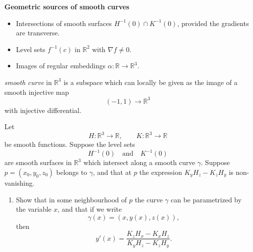 \begin{problem}
	\par\medskip\noindent\textbf{Geometric sources of smooth curves}\par\smallskip

	\begin{itemize}
		\item Intersections of smooth surfaces $H^{-1}(0)\cap K^{-1}(0)$,
		provided the gradients are transverse.
		\item Level sets $f^{-1}(c)$ in $\mathbb{R}^2$ with $\nabla f \neq 0$.
		\item Images of regular embeddings $\alpha : \mathbb{R}\to\mathbb{R}^3$.
	\end{itemize}
	
	 \emph{smooth curve} in $\mathbb{R}^3$ is a subspace which can locally be
	given as the image of a smooth injective map
	\[
	(-1,1) \to \mathbb{R}^3
	\]
	with injective differential.
	
	Let
	\[
	H : \mathbb{R}^3 \to \mathbb{R}, \qquad
	K : \mathbb{R}^3 \to \mathbb{R}
	\]
	be smooth functions.
	Suppose the level sets
	\[
	H^{-1}(0) \quad\text{and}\quad K^{-1}(0)
	\]
	are smooth surfaces in $\mathbb{R}^3$ which intersect along a smooth curve
	$\gamma$.
	Suppose $p = (x_0,y_0,z_0)$ belongs to $\gamma$, and that at $p$ the expression
	$K_y H_z - K_z H_y$ is non-vanishing.
	
	\begin{enumerate}[label=\textnormal{(\alph*)}]
		\item Show that in some neighbourhood of $p$ the curve $\gamma$ can be
		parametrized by the variable $x$, and that if we write
		\[
		\gamma(x) = (x,y(x),z(x)),
		\]
		then
		\[
		y'(x) = \frac{K_z H_x - K_x H_z}{K_y H_z - K_z H_y}.
		\]
	\end{enumerate}
	
	\medskip
\end{problem}

